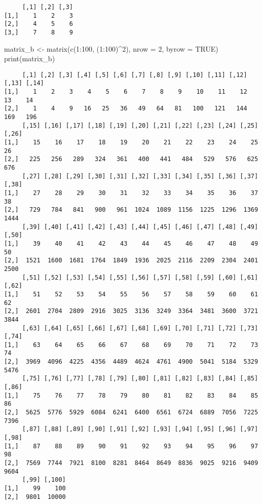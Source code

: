 \documentclass[
  letterpaper,
  DIV=11,
  numbers=noendperiod]{scrartcl}
\newenvironment{Shaded}{\begin{snugshade}}{\end{snugshade}}
\newcommand{\AttributeTok}[1]{\textcolor[rgb]{0.40,0.45,0.13}{#1}}
\newcommand{\ConstantTok}[1]{\textcolor[rgb]{0.56,0.35,0.01}{#1}}
\newcommand{\DecValTok}[1]{\textcolor[rgb]{0.68,0.00,0.00}{#1}}
\newcommand{\FunctionTok}[1]{\textcolor[rgb]{0.28,0.35,0.67}{#1}}
\newcommand{\NormalTok}[1]{\textcolor[rgb]{0.00,0.23,0.31}{#1}}
\newcommand{\OtherTok}[1]{\textcolor[rgb]{0.00,0.23,0.31}{#1}}
\newcommand{\SpecialCharTok}[1]{\textcolor[rgb]{0.37,0.37,0.37}{#1}}
\begin{document}
\begin{verbatim}
     [,1] [,2] [,3]
[1,]    1    2    3
[2,]    4    5    6
[3,]    7    8    9
\end{verbatim}

\begin{Shaded}
\begin{Highlighting}[]
\NormalTok{matrix\_b }\OtherTok{\textless{}{-}} \FunctionTok{matrix}\NormalTok{(}\FunctionTok{c}\NormalTok{(}\DecValTok{1}\SpecialCharTok{:}\DecValTok{100}\NormalTok{, (}\DecValTok{1}\SpecialCharTok{:}\DecValTok{100}\NormalTok{)}\SpecialCharTok{\^{}}\DecValTok{2}\NormalTok{), }\AttributeTok{nrow =} \DecValTok{2}\NormalTok{, }\AttributeTok{byrow =} \ConstantTok{TRUE}\NormalTok{)}
\FunctionTok{print}\NormalTok{(matrix\_b)}
\end{Highlighting}
\end{Shaded}

\begin{verbatim}
     [,1] [,2] [,3] [,4] [,5] [,6] [,7] [,8] [,9] [,10] [,11] [,12] [,13] [,14]
[1,]    1    2    3    4    5    6    7    8    9    10    11    12    13    14
[2,]    1    4    9   16   25   36   49   64   81   100   121   144   169   196
     [,15] [,16] [,17] [,18] [,19] [,20] [,21] [,22] [,23] [,24] [,25] [,26]
[1,]    15    16    17    18    19    20    21    22    23    24    25    26
[2,]   225   256   289   324   361   400   441   484   529   576   625   676
     [,27] [,28] [,29] [,30] [,31] [,32] [,33] [,34] [,35] [,36] [,37] [,38]
[1,]    27    28    29    30    31    32    33    34    35    36    37    38
[2,]   729   784   841   900   961  1024  1089  1156  1225  1296  1369  1444
     [,39] [,40] [,41] [,42] [,43] [,44] [,45] [,46] [,47] [,48] [,49] [,50]
[1,]    39    40    41    42    43    44    45    46    47    48    49    50
[2,]  1521  1600  1681  1764  1849  1936  2025  2116  2209  2304  2401  2500
     [,51] [,52] [,53] [,54] [,55] [,56] [,57] [,58] [,59] [,60] [,61] [,62]
[1,]    51    52    53    54    55    56    57    58    59    60    61    62
[2,]  2601  2704  2809  2916  3025  3136  3249  3364  3481  3600  3721  3844
     [,63] [,64] [,65] [,66] [,67] [,68] [,69] [,70] [,71] [,72] [,73] [,74]
[1,]    63    64    65    66    67    68    69    70    71    72    73    74
[2,]  3969  4096  4225  4356  4489  4624  4761  4900  5041  5184  5329  5476
     [,75] [,76] [,77] [,78] [,79] [,80] [,81] [,82] [,83] [,84] [,85] [,86]
[1,]    75    76    77    78    79    80    81    82    83    84    85    86
[2,]  5625  5776  5929  6084  6241  6400  6561  6724  6889  7056  7225  7396
     [,87] [,88] [,89] [,90] [,91] [,92] [,93] [,94] [,95] [,96] [,97] [,98]
[1,]    87    88    89    90    91    92    93    94    95    96    97    98
[2,]  7569  7744  7921  8100  8281  8464  8649  8836  9025  9216  9409  9604
     [,99] [,100]
[1,]    99    100
[2,]  9801  10000
\end{verbatim}
\end{document}
